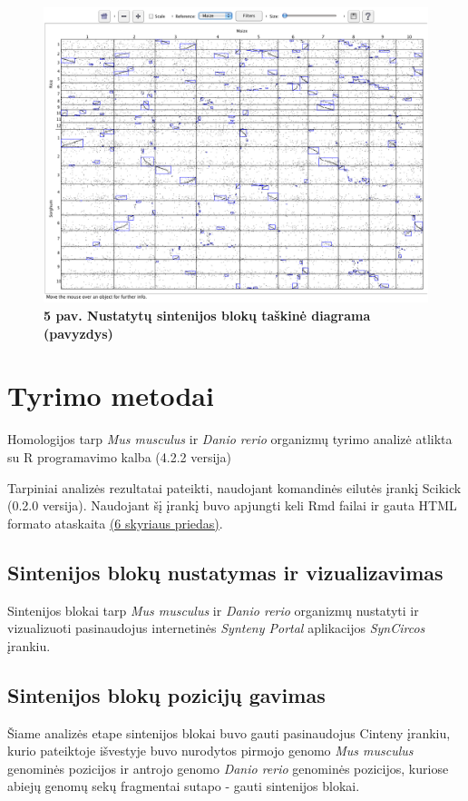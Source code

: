 \documentclass[12pt]{article}
\begin{document}
\begin{figure}[htb]
    \begin{center}
        \includegraphics[width=0.8\linewidth]{../Figures/Synteny_dotplot_example.png}
        \vspace{-0.5\baselineskip}
        \caption*{\small\textbf{5 pav. Nustatytų sintenijos blokų taškinė
        diagrama (pavyzdys)}}
        \label{fig:birds}
    \end{center}
\end{figure}

\newpage


\section{Tyrimo metodai}
Homologijos tarp \emph{Mus musculus} ir \emph{Danio rerio} organizmų tyrimo
analizė atlikta su R programavimo kalba\cite{R} (4.2.2 versija)

Tarpiniai analizės rezultatai pateikti, naudojant komandinės eilutės įrankį
Scikick\cite{SCIK} (0.2.0 versija). Naudojant šį įrankį buvo apjungti keli Rmd
failai ir gauta HTML formato ataskaita \hyperref[Priedas]{(6 skyriaus priedas)}.

\subsection{Sintenijos blokų nustatymas ir vizualizavimas}
Sintenijos blokai tarp \emph{Mus musculus} ir \emph{Danio rerio} organizmų
nustatyti ir vizualizuoti pasinaudojus internetinės
\emph{Synteny Portal}\cite{SYN_PORT} aplikacijos \emph{SynCircos} įrankiu.

\subsection{Sintenijos blokų pozicijų gavimas}
Šiame analizės etape sintenijos blokai buvo gauti pasinaudojus Cinteny
įrankiu, kurio pateiktoje išvestyje buvo nurodytos pirmojo genomo
\emph{Mus musculus} genominės pozicijos ir antrojo genomo \emph{Danio rerio}
genominės pozicijos, kuriose abiejų genomų sekų fragmentai sutapo - gauti
sintenijos blokai.
\end{document}

